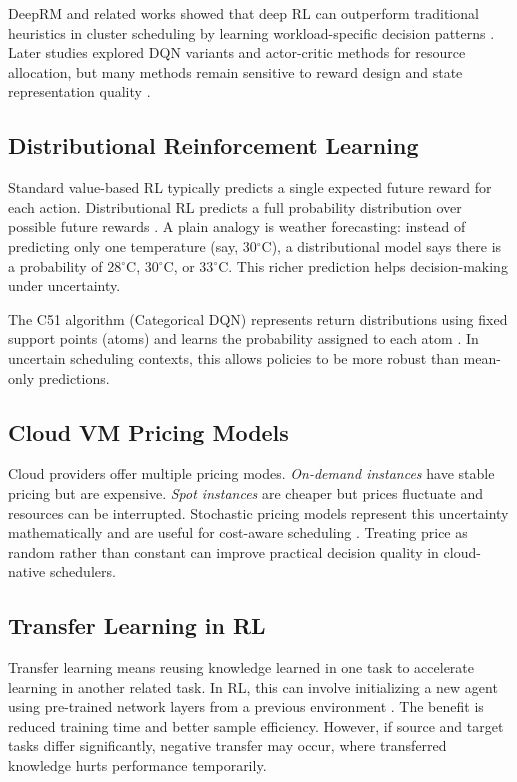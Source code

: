DeepRM and related works showed that deep RL can outperform traditional heuristics in cluster scheduling by learning workload-specific decision patterns \cite{mao2016resource}. Later studies explored DQN variants and actor-critic methods for resource allocation, but many methods remain sensitive to reward design and state representation quality \cite{mao2019park}.

\subsection{Distributional Reinforcement Learning}
Standard value-based RL typically predicts a single expected future reward for each action. Distributional RL predicts a full probability distribution over possible future rewards \cite{bellemare2017distributional}. A plain analogy is weather forecasting: instead of predicting only one temperature (say, 30$^\circ$C), a distributional model says there is a probability of 28$^\circ$C, 30$^\circ$C, or 33$^\circ$C. This richer prediction helps decision-making under uncertainty.

The C51 algorithm (Categorical DQN) represents return distributions using fixed support points (atoms) and learns the probability assigned to each atom \cite{bellemare2017distributional}. In uncertain scheduling contexts, this allows policies to be more robust than mean-only predictions.

\subsection{Cloud VM Pricing Models}
Cloud providers offer multiple pricing modes. \emph{On-demand instances} have stable pricing but are expensive. \emph{Spot instances} are cheaper but prices fluctuate and resources can be interrupted. Stochastic pricing models represent this uncertainty mathematically and are useful for cost-aware scheduling \cite{spot2013deconstructing}. Treating price as random rather than constant can improve practical decision quality in cloud-native schedulers.

\subsection{Transfer Learning in RL}
Transfer learning means reusing knowledge learned in one task to accelerate learning in another related task. In RL, this can involve initializing a new agent using pre-trained network layers from a previous environment \cite{taylor2009transfer}. The benefit is reduced training time and better sample efficiency. However, if source and target tasks differ significantly, negative transfer may occur, where transferred knowledge hurts performance temporarily.

